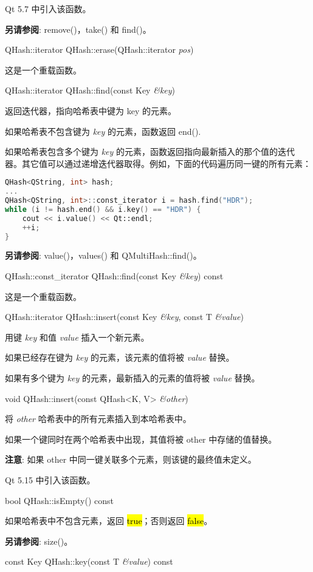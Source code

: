 Qt 5.7 中引入该函数。

\textbf{另请参阅}: remove()，take() 和 find()。

QHash::iterator QHash::erase(QHash::iterator \emph{pos})

这是一个重载函数。

QHash::iterator QHash::find(const Key \emph{\&key})

返回迭代器，指向哈希表中键为 key 的元素。

如果哈希表不包含键为 \emph{key} 的元素，函数返回 end().

如果哈希表包含多个键为 \emph{key} 的元素，函数返回指向最新插入的那个值的迭代器。其它值可以通过递增迭代器取得。例如，下面的代码遍历同一键的所有元素：

\begin{lstlisting}[language=C++]
QHash<QString, int> hash;
...
QHash<QString, int>::const_iterator i = hash.find("HDR");
while (i != hash.end() && i.key() == "HDR") {
    cout << i.value() << Qt::endl;
    ++i;
}
\end{lstlisting}

\textbf{另请参阅}: value()，values() 和 QMultiHash::find()。

QHash::const\_iterator QHash::find(const Key \emph{\&key}) const

这是一个重载函数。

QHash::iterator QHash::insert(const Key \emph{\&key}, const T \emph{\&value})

用键 \emph{key} 和值 \emph{value} 插入一个新元素。

如果已经存在键为 \emph{key} 的元素，该元素的值将被 \emph{value} 替换。

如果有多个键为 \emph{key} 的元素，最新插入的元素的值将被 \emph{value }替换。

void QHash::insert(const QHash<K, V> \emph{\&other})

将 \emph{other} 哈希表中的所有元素插入到本哈希表中。

如果一个键同时在两个哈希表中出现，其值将被 other 中存储的值替换。

\textbf{注意}: 如果 other 中同一键关联多个元素，则该键的最终值未定义。

Qt 5.15 中引入该函数。

bool QHash::isEmpty() const

如果哈希表中不包含元素，返回 \hl{true}；否则返回 \hl{false}。

\textbf{另请参阅}: size()。

const Key QHash::key(const T \emph{\&value}) const

